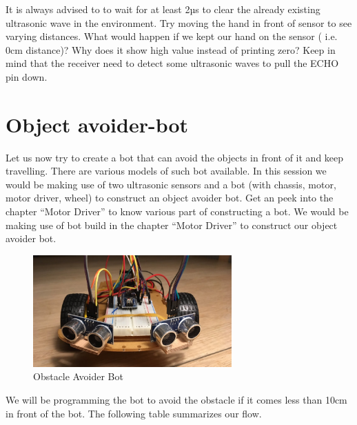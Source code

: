 It is always advised to to wait for at least 2µs to clear the already existing ultrasonic wave in the environment. Try moving the hand in front of sensor to see varying distances. What would happen if we kept our hand on the sensor ( i.e. 0cm distance)? Why does it show high value instead of printing zero? Keep in mind that the receiver need to detect some ultrasonic waves to pull the ECHO pin down.

\section{Object avoider-bot}
Let us now try to create a bot that can avoid the objects in front of it and keep travelling. There are various models of such bot available. In this session we would be making use of two ultrasonic sensors and a bot (with chassis, motor, motor driver, wheel) to construct an object avoider bot. Get an peek into the chapter “Motor Driver” to know various part of constructing a bot. We would be making use of bot build in the chapter “Motor Driver” to construct our object avoider bot.
\vspace{0.5cm}
\begin{figure}
    \centering
    \includegraphics[width=3in]{Chapters/images/ultraSonic_bot.png}
    \caption{Obstacle Avoider Bot}
\end{figure}


We will be programming the bot to avoid the obstacle if it comes less than 10cm in front of the bot. The following table summarizes our flow.

